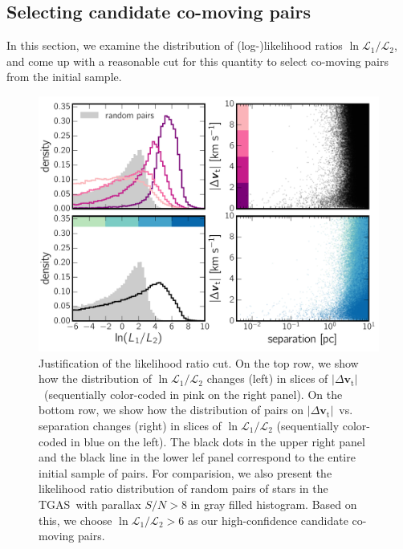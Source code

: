 \documentclass[manuscript, letterpaper]{aastex6}
\newcommand{\acronym}[1]{{\small{#1}}}
\newcommand{\tgas}{\acronym{TGAS}}
\newcommand{\bs}[1]{\boldsymbol{#1}}
\renewcommand{\vec}[1]{\bs{#1}}
\newcommand{\absdvtan}{\ensuremath{|\Delta\vec v_\mathrm{t}|}}
\begin{document}
\subsection{Selecting candidate co-moving pairs}
\label{sub:selection}

In this section, we examine the distribution of (log-)likelihood ratios
$\ln \mathcal{L}_1 /\mathcal{L}_2$, and come up with a reasonable cut
for this quantity to select co-moving pairs from the initial sample.

\begin{figure}[htbp]
  \begin{center}
    \includegraphics[width=\textwidth]{figures/likelihoodratios.pdf}
  \end{center}
  \caption{%
    Justification of the likelihood ratio cut.
    On the top row, we show how the distribution of $\ln \mathcal{L}_1 /\mathcal{L}_2$
    changes (left) in slices of \absdvtan\ (sequentially color-coded in pink on the right panel).
    On the bottom row, we show how the distribution of pairs on \absdvtan\ vs. separation changes (right)
    in slices of $\ln \mathcal{L}_1 /\mathcal{L}_2$ (sequentially color-coded in blue on the left).
    The black dots in the upper right panel and
    the black line in the lower lef panel correspond to the entire initial sample of pairs.
    For comparision, we also present the likelihood ratio distribution of random pairs
    of stars in the \tgas\ with parallax $S/N>8$ in gray filled histogram.
    Based on this, we choose $\ln \mathcal{L}_1 /\mathcal{L}_2 > 6$ as our high-confidence
    candidate co-moving pairs.
    \label{fig:likelihoodratios}}
    \vspace{1em}
\end{figure}
\end{document}
